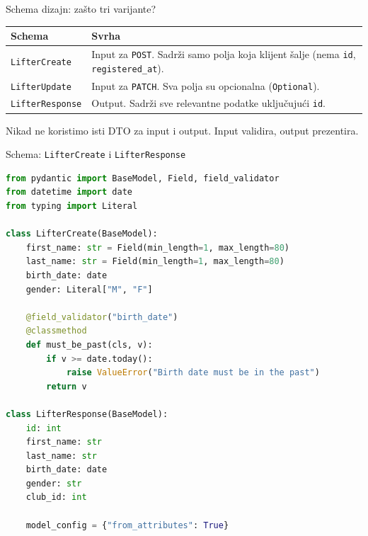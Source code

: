 \begin{frame}{Schema dizajn: zašto tri varijante?}
\begin{tabular}{@{}lp{8cm}@{}}
  \toprule
  \textbf{Schema} & \textbf{Svrha} \\
  \midrule
  \texttt{LifterCreate} & Input za \texttt{POST}. Sadrži samo polja koja klijent šalje (nema \texttt{id}, \texttt{registered\_at}). \\
  \midrule
  \texttt{LifterUpdate} & Input za \texttt{PATCH}. Sva polja su opcionalna (\texttt{Optional}). \\
  \midrule
  \texttt{LifterResponse} & Output. Sadrži sve relevantne podatke uključujući \texttt{id}. \\
  \bottomrule
\end{tabular}

\vspace{0.6em}
Nikad ne koristimo isti DTO za input i output. Input validira, output prezentira.
\end{frame}

\begin{frame}[fragile,shrink=5]{Schema: \texttt{LifterCreate} i \texttt{LifterResponse}}
\begin{lstlisting}[language=python]
from pydantic import BaseModel, Field, field_validator
from datetime import date
from typing import Literal

class LifterCreate(BaseModel):
    first_name: str = Field(min_length=1, max_length=80)
    last_name: str = Field(min_length=1, max_length=80)
    birth_date: date
    gender: Literal["M", "F"]

    @field_validator("birth_date")
    @classmethod
    def must_be_past(cls, v):
        if v >= date.today():
            raise ValueError("Birth date must be in the past")
        return v

class LifterResponse(BaseModel):
    id: int
    first_name: str
    last_name: str
    birth_date: date
    gender: str
    club_id: int

    model_config = {"from_attributes": True}
\end{lstlisting}
\end{frame}

